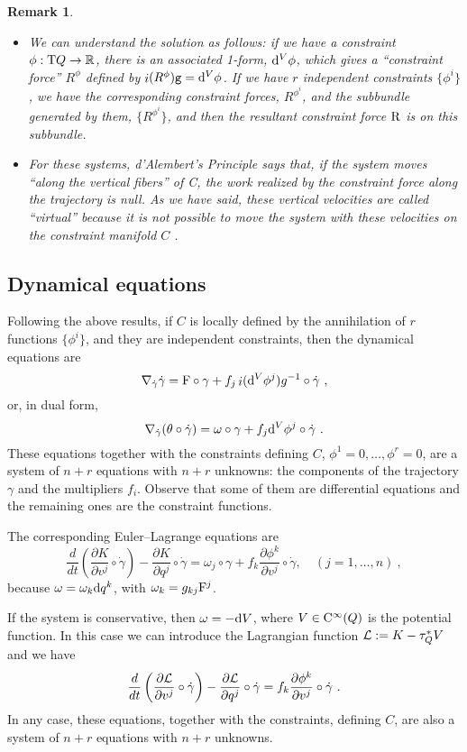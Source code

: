 \documentclass[12pt]{report}
\newtheorem{remark}[teor]{Remark}
\def\bit{\begin{itemize}}
\def\eit{\end{itemize}}
\def\derpar#1#2{\frac{\partial{#1}}{\partial{#2}}}
\def\Lag{{\cal L}}
\def\d{{\rm d}}
\def\Real{\mathbb{R}}
\def\Tan{{\rm T}}
\def\inn{\mathop{i}\nolimits}
\def\Cinfty{{\rm C}^\infty}
\begin{document}
\begin{remark}{\rm  
\bit
\item 
We can understand the solution as follows: if we have a constraint $\phi:\Tan Q\to\Real$, there is an associated 1-form, $\d^V\phi$, which gives a ``constraint force'' $R^{\phi}$ defined by $\inn(R^{\phi}){\tt g}=\d^V\phi$.
If we have $r$ independent constraints $\{\phi^i\}$, we have the corresponding constraint forces, $R^{\phi^i}$, and the subbundle generated by them, $\{R^{\phi^i}\}$, and then the resultant constraint force ${\rm R}$ is on this subbundle.
\item 
For these systems, d'Alembert's Principle says that, if the system moves ``along the vertical fibers'' of C,  the work realized by the constraint force along the trajectory is null. As we have said, these vertical velocities are called ``virtual'' because it is not possible to move the system with these velocities on the constraint manifold $C$ .
\eit
}\end{remark}


\subsection{Dynamical equations}


Following the above results,
if $C$ is locally defined by the annihilation of
$r$  functions $\{\phi^i\}$, and they are independent constraints,
then the dynamical equations are
$$
\nabla_{\dot\gamma}\dot\gamma ={\rm F}\circ\gamma+f_j\inn(\d^V\phi^j)g^{-1}\circ\dot\gamma \ ,
$$
or, in dual form,
$$
\nabla_{\dot\gamma}(\theta\circ\dot\gamma)=
\omega\circ\gamma+f_j\d^V\phi^j\circ\dot\gamma \ .
$$
These equations together with the constraints defining $C$, $\phi^1=0,\ldots,\phi^r=0$,
are a system of $n+r$ equations with $n+r$ unknowns:
the components of the trajectory $\gamma$ and the multipliers $f_i$. Observe that some of them are differential equations and the remaining ones are the constraint functions.

The corresponding Euler--Lagrange equations are
$$
\frac{d}{d t}\left(\derpar{K}{v^j}\circ\dot\gamma\right)-
\derpar{K}{q^j}\circ\dot\gamma=
\omega_j\circ\gamma +f_k\derpar{\phi^k}{v^j}\circ\dot\gamma
,\quad (j=1,\ldots ,n) \ ,
$$
because $\omega=\omega_k\d q^k$, with $\omega_k=g_{kj}{\rm F}^j$.

If the system is conservative, then $\omega=-\d V$,
where $V\in\Cinfty (Q)$ is the potential function. In this case we can introduce the Lagrangian function $\Lag:=K-\tau_Q^*V$ and we have
$$
\frac{d}{d t}\left(\derpar{\Lag }{v^j}\circ\dot\gamma\right)-
\derpar{\Lag}{q^j}\circ\dot\gamma=
f_k\derpar{\phi^k}{v^j}\circ\dot\gamma \ .
$$
In any case, these equations, together with the constraints, defining $C$, are also a system of $n+r$ equations with $n+r$ unknowns.
\end{document}
